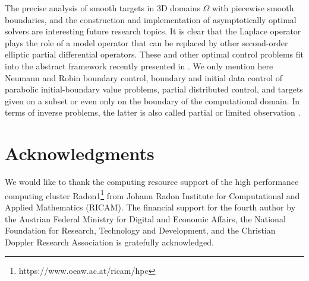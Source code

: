 \documentclass{article}
\numberwithin{equation}{section}
\begin{document}
The precise analysis of smooth targets in
3D domains $\Omega$ with piecewise smooth boundaries, 
and the construction and implementation of asymptotically optimal solvers 
are interesting future research topics. It is clear that the Laplace 
operator plays the role of a model operator that can be replaced 
by other second-order elliptic partial differential operators.
These and other optimal control problems fit into the abstract 
framework recently presented in
\cite{LangerLoescherSteinbachYang2025arXiv2505.19062}.
We only mention here Neumann \cite{BrennerSung2025RAM}
and Robin boundary control,
boundary and initial data control of parabolic initial-boundary value
problems, partial distributed control, and targets given on a subset
or even only on the boundary of the computational domain.
In terms of inverse problems, the latter is also called 
partial or limited observation \cite{MardalNielsenNordaas2017BIT}.


%
%

\section*{Acknowledgments}
We would like to thank the computing resource support of
the high performance computing cluster
Radon1\footnote{https://www.oeaw.ac.at/ricam/hpc} from Johann Radon Institute
for Computational and Applied Mathematics (RICAM). The financial support for the fourth author by the
Austrian Federal Ministry for Digital and Economic Affairs, the National
Foundation for Research, Technology and Development, and the Christian
Doppler Research Association is gratefully acknowledged.

  


 
  
\end{document}
